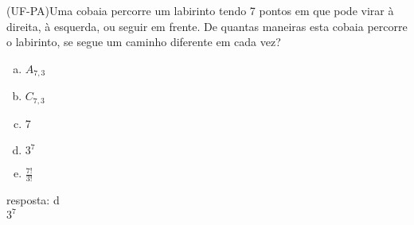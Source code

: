 \begin{ex}
  	(UF-PA)Uma cobaia percorre um labirinto tendo 7 pontos em que pode virar à direita, à esquerda, ou seguir em frente. De quantas maneiras esta cobaia percorre o labirinto, se segue um caminho diferente em cada vez?
    \begin{enumerate}[(a)]
    \item $A_{7,3}$
    \item $C_{7,3}$
    \item 7
    \item $3^7$
    \item $\frac{7!}{3!}$
    \end{enumerate}
    \begin{sol}
      resposta: d \\
      $3^7$
    \end{sol}
\end{ex}